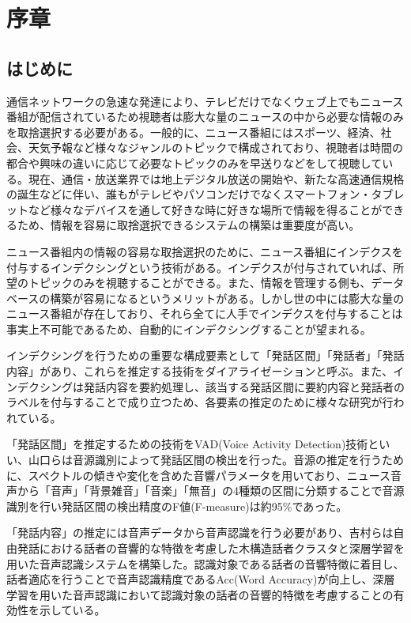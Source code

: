 \chapter{序章}
\section{はじめに}
通信ネットワークの急速な発達により、テレビだけでなくウェブ上でもニュース番組が配信されているため視聴者は膨大な量のニュースの中から必要な情報のみを取捨選択する必要がある。一般的に、ニュース番組にはスポーツ、経済、社会、天気予報など様々なジャンルのトピックで構成されており、視聴者は時間の都合や興味の違いに応じて必要なトピックのみを早送りなどをして視聴している。現在、通信・放送業界では地上デジタル放送の開始や、新たな高速通信規格の誕生などに伴い、誰もがテレビやパソコンだけでなくスマートフォン・タブレットなど様々なデバイスを通して好きな時に好きな場所で情報を得ることができるため、情報を容易に取捨選択できるシステムの構築は重要度が高い。\par

ニュース番組内の情報の容易な取捨選択のために、ニュース番組にインデクスを付与するインデクシングという技術がある。インデクスが付与されていれば、所望のトピックのみを視聴することができる。また、情報を管理する側も、データベースの構築が容易になるというメリットがある。しかし世の中には膨大な量のニュース番組が存在しており、それら全てに人手でインデクスを付与することは事実上不可能であるため、自動的にインデクシングすることが望まれる。\par

インデクシングを行うための重要な構成要素として「発話区間」「発話者」「発話内容」があり、これらを推定する技術をダイアライゼーションと呼ぶ。また、インデクシングは発話内容を要約処理し、該当する発話区間に要約内容と発話者のラベルを付与することで成り立つため、各要素の推定のために様々な研究が行われている。\par

「発話区間」を推定するための技術をVAD(Voice Activity Detection)技術\cite{vad}といい、山口ら\cite{yamaguchi_indexing}は音源識別によって発話区間の検出を行った。音源の推定を行うために、スペクトルの傾きや変化を含めた音響パラメータを用いており、ニュース音声から「音声」「背景雑音」「音楽」「無音」の4種類の区間に分類することで音源識別を行い発話区間の検出精度のF値(F-measure)は約95\%であった。\par

「発話内容」の推定には音声データから音声認識を行う必要があり、吉村ら\cite{yoshimura_clustering}は自由発話における話者の音響的な特徴を考慮した木構造話者クラスタと深層学習を用いた音声認識システムを構築した。認識対象である話者の音響特徴に着目し、話者適応を行うことで音声認識精度であるAcc(Word Accuracy)が向上し、深層学習を用いた音声認識において認識対象の話者の音響的特徴を考慮することの有効性を示している。\par

